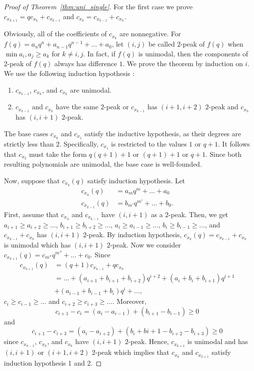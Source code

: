 \documentclass{article}
\theoremstyle{remark}
\begin{document}
\begin{proof}[Proof of Theorem~\ref{thm:uni_single}]
For the first case we prove $c_{x_{k+1}}=qc_{x_k}+c_{x_{k-1}}$ and $c_{x_k}=c_{x_{k-1}}+c_{x_h}$.

Obviously, all of the coefficients of $c_{x_{k}}$ are nonnegative. For $f(q)=a_{n} q^n+a_{n-1}q^{n-1}+\dots+a_0$, let $(i,j)$ be called $2$-peak of $f(q)$ when $\min{a_{i},a_{j}}\ge a_{k}$ for $k\neq i,j$. In fact, if $f(q)$ is unimodal, then the components of $2$-peak of $f(q)$ always has difference $1$. We prove the theorem by induction on $i$. We use the following induction hypothesis :
\begin{enumerate}
\item $c_{x_{k-1}}$, $c_{x_h}$, and $c_{x_k}$ are unimodal.
\item $c_{x_{k-1}}$ and $c_{x_{h}}$ have the same $2$-peak or $c_{x_{k-1}}$ has $(i+1,i+2)$ $2$-peak and $c_{x_{h}}$ has $(i,i+1)$ $2$-peak.
\end{enumerate}
The base cases $c_{x_0}$ and $c_{x_1}$ satisfy the inductive hypothesis, as their degrees are strictly less than $2$. Specifically, $c_{x_1}$ is restricted to the values $1$ or $q+1$. It follows that $c_{x_2}$ must take the form $q(q+1)+1$ or $(q+1)+1$ or $q+1$. Since both resulting polynomials are unimodal, the base case is well-founded.

Now, suppose that $c_{x_k}(q)$ satisfy induction hypothesis. Let
\begin{align*}
c_{x_h}(q)&=a_{m}q^m+\dots+a_0\\
c_{x_{k-1}}(q)&=b_{m'}q^{m'}+\dots+b_0.
\end{align*}
First, assume that $c_{x_h}$ and $c_{x_{k-1}}$ have $(i,i+1)$ as a $2$-peak. Then, we get $a_{i+1}\ge a_{i+2}\ge \dots$, $b_{i+1}\ge b_{i+2}\ge \dots$, $a_{i}\ge a_{i-1}\ge \dots$, $b_{i}\ge b_{i-1}\ge \dots$, and $c_{x_{k-1}}+c_{x_h}$ has $(i,i+1)$ $2$-peak. By induction hypothesis, $c_{x_k}(q)=c_{x_{k-1}}+c_{x_h}$ is unimodal which has $(i,i+1)$ $2$-peak. Now we consider $c_{x_{k+1}}(q)=c_{m''}q^{m''}+\dots+c_0$. Since
\begin{align*}
c_{x_{k+1}}(q)&=(q+1)c_{x_{k-1}}+qc_{x_h}\\
&=\dots+(a_{i+1}+b_{i+1}+b_{i+2})q^{i+2}+(a_i+b_i+b_{i+1})q^{i+1}\\
&+(a_{i-1}+b_{i-1}+b_{i})q^{i}+\dots,
\end{align*}
$c_{i}\ge c_{i-1}\ge \dots$ and $c_{i+2}\ge c_{i+3}\ge \dots$. Moreover, \[
c_{i+1}-c_{i}=(a_{i}-a_{i-1})+(b_{i+1}-b_{i-1})\ge 0
\]
and \[
c_{i+1}-c_{i+3}=(a_{i}-a_{i+2})+(b_{i}+b{i+1}-b_{i+2}-b_{i+3})\ge 0
\]
since $c_{x_{k-1}}$, $c_{x_h}$, and $c_{x_{k}}$ have $(i,i+1)$ $2$-peak. Hence, $c_{x_{k+1}}$ is unimodal and has $(i,i+1)$ or $(i+1,i+2)$ $2$-peak which implies that $c_{x_k}$ and $c_{x_{k+1}}$ satisfy induction hypothesis 1 and 2.


\end{proof}
\end{document}
